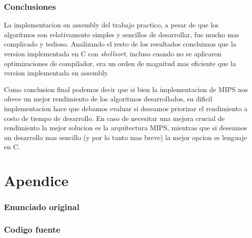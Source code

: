 \documentclass[a4paper,11pt]{article}
\begin{document}
\section{Conclusiones}

La implementacion en assembly del trabajo practico, a pesar de que los algoritmos son relativamente simples y sencillos de desarrollar, fue
mucho mas complicado y tedioso. 
Analizando el resto de los resultados concluimos que la version implementada en
C con \textit{shellsort}, incluso cuando no se aplicaron optimizaciones de
compilador, era un orden de magnitud mas eficiente que la version implementada
en assembly. 

Como conclusion final podemos decir que si bien la implementacion de MIPS nos ofrece un mejor rendimiento de los algoritmos desarrollados, su dificil implementacion hace que debamos evaluar si deseamos priorizar el rendimiento a costo de tiempo de desarrollo. En caso de necesitar una mejora crucial de rendimiento la mejor solucion es la arquitectura MIPS, mientras que si deseamos un desarrollo mas sencillo (y por lo tanto mas breve) la mejor opcion es lenguaje en C.

\clearpage

\part{Apendice}
\appendix

\section{Enunciado original}\label{sec:enunciado}


\clearpage
\section{Codigo fuente}\label{sec:source}
\clearpage
{}

%
%
\end{document}
